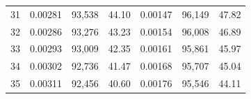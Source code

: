\begin{tabular}{cccc|ccc}
31   & 0.00281                                                          & 93,538                                                                                            & 44.10                                                                                                                      & 0.00147                                                          & 96,149                                                                                            & 47.82                                                                                                                      \\
32   & 0.00286                                                          & 93,276                                                                                            & 43.23                                                                                                                      & 0.00154                                                          & 96,008                                                                                            & 46.89                                                                                                                      \\
33   & 0.00293                                                          & 93,009                                                                                            & 42.35                                                                                                                      & 0.00161                                                          & 95,861                                                                                            & 45.97                                                                                                                      \\
34   & 0.00302                                                          & 92,736                                                                                            & 41.47                                                                                                                      & 0.00168                                                          & 95,707                                                                                            & 45.04                                                                                                                      \\
35   & 0.00311                                                          & 92,456                                                                                            & 40.60                                                                                                                      & 0.00176                                                          & 95,546                                                                                            & 44.11                                                                                                                      \\

\end{tabular}
